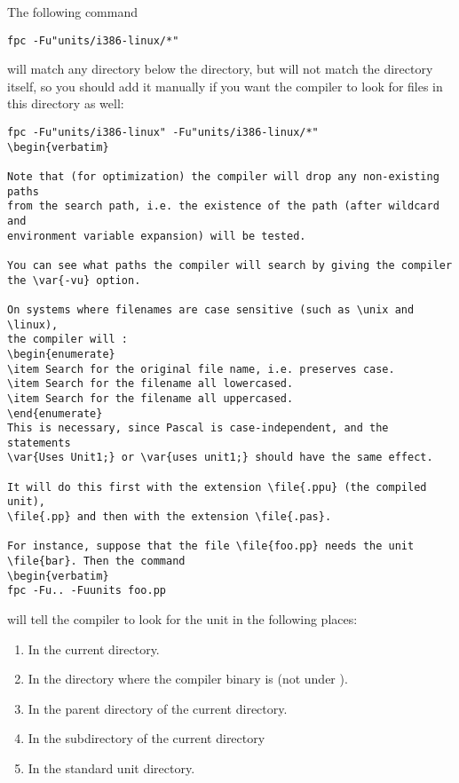 The following command
\begin{verbatim}
fpc -Fu"units/i386-linux/*"
\end{verbatim}
will match any directory below the  directory, 
but will not match the  directory itself, so
you should add it manually if you want the compiler to look for files
in this directory as well:
\begin{verbatim}
fpc -Fu"units/i386-linux" -Fu"units/i386-linux/*"
\begin{verbatim}

Note that (for optimization) the compiler will drop any non-existing paths 
from the search path, i.e. the existence of the path (after wildcard and
environment variable expansion) will be tested.

You can see what paths the compiler will search by giving the compiler
the \var{-vu} option.

On systems where filenames are case sensitive (such as \unix and \linux), 
the compiler will :
\begin{enumerate}
\item Search for the original file name, i.e. preserves case.
\item Search for the filename all lowercased.
\item Search for the filename all uppercased.
\end{enumerate}
This is necessary, since Pascal is case-independent, and the statements 
\var{Uses Unit1;} or \var{uses unit1;} should have the same effect.

It will do this first with the extension \file{.ppu} (the compiled unit),
\file{.pp} and then with the extension \file{.pas}.

For instance, suppose that the file \file{foo.pp} needs the unit
\file{bar}. Then the command
\begin{verbatim}
fpc -Fu.. -Fuunits foo.pp
\end{verbatim}
will tell the compiler to look for the unit  in the following
places:
\begin{enumerate}
\item In the current directory.
\item In the directory where the compiler binary is (not under \linux).
\item In the parent directory of the current directory.
\item In the subdirectory  of the current directory
\item In the standard unit directory.
\end{enumerate}

